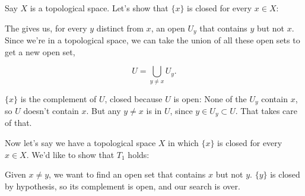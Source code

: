 \documentclass[12pt]{article}
\begin{document}

Say $X$ is a  topological space.  Let's show that $\{x\}$ is closed for every $x\in X$:

The  gives us, for every $y$ distinct from $x$, an open $U_y$ that contains $y$ but not $x$.  Since we're in a topological space, we can take the union of all these open sets to get a new open set,

\[U=\bigcup_{y\neq x} U_y .\]

$\{x\}$ is the complement of $U$, closed because $U$ is open: None of the $U_y$ contain $x$, so $U$ doesn't contain $x$.  But any $y\neq x$ is in $U$, since $y\in U_y\subset U$.  That takes care of that.

Now let's say we have a topological space $X$ in which $\{x\}$ is closed for every $x\in X$.  We'd like to show that $T_1$ holds:

Given $x\neq y$, we want to find an open set that contains $x$ but not $y$.  $\{y\}$ is closed by hypothesis, so its complement is open, and our search is over.
\end{document}
